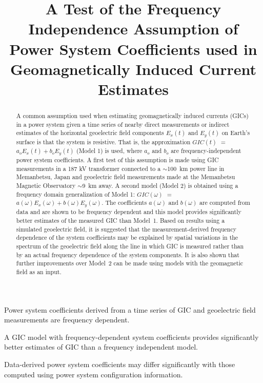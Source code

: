 \documentclass[draft,linenumbers]{agujournal2018}
\begin{document}
\title{A Test of the Frequency Independence Assumption of Power System Coefficients used in Geomagnetically Induced Current Estimates}





\begin{keypoints}
\item Power system coefficients derived from a time series of GIC and geoelectric field measurements are frequency dependent.
\item A GIC model with frequency-dependent system coefficients provides significantly better estimates of GIC than a frequency independent model.
\item Data-derived power system coefficients may differ significantly with those computed using power system configuration information.
\end{keypoints}

\begin{abstract}
  A common assumption used when estimating geomagnetically induced currents (GICs) in a power system given a time series of nearby direct measurements or indirect estimates of the horizontal geoelectric field components $E_x(t)$ and $E_y(t)$ on Earth's surface is that the system is resistive. That is, the approximation $GIC(t)$  $=$ $a_oE_x(t) + b_oE_y(t)$ (Model 1) is used, where $a_o$ and $b_o$ are frequency-independent power system coefficients.  A first test of this assumption is made using GIC measurements in a 187 kV transformer connected to a $\sim$100~km power line in Memanbetsu, Japan and geoelectric field measurements made at the Memanbetsu Magnetic Observatory $\sim$9~km away. A second model (Model 2) is obtained using a frequency domain generalization of Model 1: $GIC(\omega)$ $=$ $a(\omega)E_x(\omega) + b(\omega)E_y(\omega)$. The coefficients $a(\omega)$ and $b(\omega)$ are computed from data and are shown to be frequency dependent and this model provides significantly better estimates of the measured GIC than Model~1. Based on results using a simulated geoelectric field, it is suggested that the measurement-derived frequency dependence of the system coefficients may be explained by spatial variations in the spectrum of the geoelectric field along the line in which GIC is measured rather than by an actual frequency dependence of the system components. It is also shown that further improvements over Model~2 can be made using models with the geomagnetic field as an input.
\end{abstract}
\end{document}
